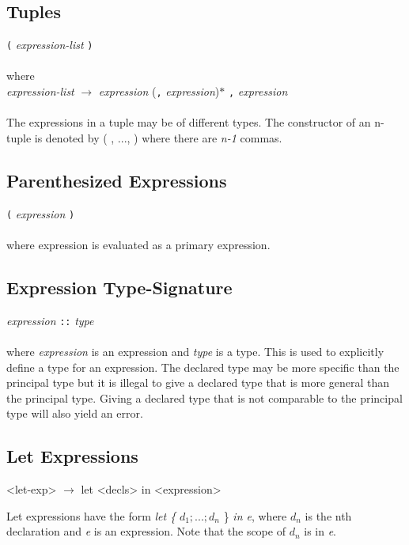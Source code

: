 \subsection{Tuples}
  \texttt{(} \emph{expression-list} \texttt{)} \\ \\
  where \\
  
  \emph{expression-list} $\rightarrow$  \emph{expression} (\texttt{,} \emph{expression})$*$  \texttt{,} \emph{expression} \\ \\
The expressions in a tuple may be of different types. The constructor of an n-tuple is denoted by (\textunderscore
, ..., \textunderscore) where there are \textit{n-1} commas.

\subsection{Parenthesized Expressions}
  \texttt{(} \emph{expression} \texttt{)} \\ \\
  where expression is evaluated as a primary expression.

\subsection{Expression Type-Signature}
  \emph{expression} \texttt{::} \emph{type} \\ \\
  where \emph{expression} is an expression and \emph{type} is a type. This is used to explicitly define a type for an expression. The declared type may be more specific than the principal type but it is illegal to give a declared type that is more general than the principal type. Giving a declared type that is not comparable to the principal type will also yield an error.

\subsection{Let Expressions}
\begin{grammar}
<let-exp> $\rightarrow$ let <decls> in <expression>
\end{grammar}
Let expressions have the form \emph{let \{} $d_1;...;d_n$ \} \emph{in e}, where $d_n$ is the nth declaration and \emph{e} is an expression. Note that the scope of $d_n$ is in \emph{e}.


